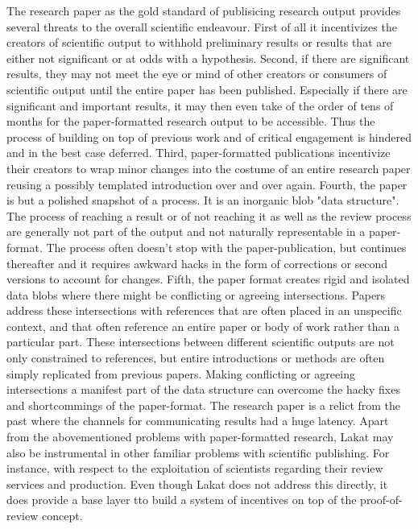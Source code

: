 \documentclass[14pt]{article}
\begin{document}
The research paper as the gold standard of publisicing research output provides several threats to the overall scientific endeavour. First of all it incentivizes the creators of scientific output to withhold preliminary results or results that are either not significant or at odds with a hypothesis. Second, if there are significant results, they may not meet the eye or mind of other creators or consumers of scientific output until the entire paper has been published. Especially if there are significant and important results, it may then even take of the order of tens of months for the paper-formatted research output to be accessible. Thus the process of building on top of previous work and of critical engagement is hindered and in the best case deferred.
Third, paper-formatted publications incentivize their creators to wrap minor changes into the costume of an entire research paper reusing a possibly templated introduction over and over again. Fourth, the paper is but a polished snapshot of a process. It is an inorganic blob "data structure". The process of reaching a result or of not reaching it as well as the review process are generally not part of the output and not naturally representable in a paper-format. The process often doesn't stop with the paper-publication, but continues thereafter and it requires awkward hacks in the form of corrections or second versions to account for changes. Fifth, the paper format creates rigid and isolated data blobs where there might be conflicting or agreeing intersections. Papers address these intersections with references that are often placed in an unspecific context, and that often reference an entire paper or body of work rather than a particular part. These intersections between different scientific outputs are not only constrained to references, but entire introductions or methods are often simply replicated from previous papers. Making conflicting or agreeing intersections a manifest part of the data structure can overcome the hacky fixes and shortcommings of the paper-format. 
The research paper is a relict from the past where the channels for communicating results had a huge latency. Apart from the abovementioned problems with paper-formatted research, Lakat may also be instrumental in other familiar problems with scientific publishing. For instance, with respect to the exploitation of scientists regarding their review services and production. Even though Lakat does not address this directly, it does provide a base layer tto build a system of incentives on top of the proof-of-review concept.
\end{document}
